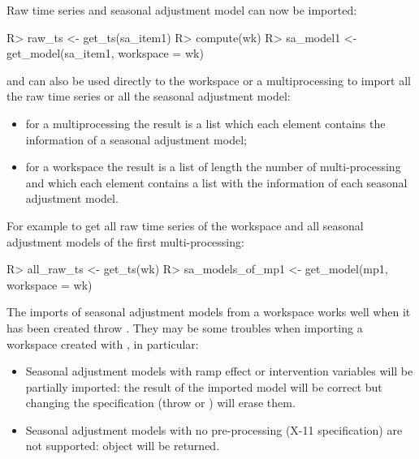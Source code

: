 \documentclass[article]{jss}
\providecommand{\tightlist}{%
  \setlength{\itemsep}{0pt}\setlength{\parskip}{0pt}}
\begin{document}
Raw time series and seasonal adjustment model can now be imported:

\begin{CodeChunk}

\begin{CodeInput}
R> raw_ts <- get_ts(sa_item1)
R> compute(wk)
R> sa_model1 <- get_model(sa_item1, workspace = wk)
\end{CodeInput}
\end{CodeChunk}

 and  can also be used directly to the
workspace or a multiprocessing to import all the raw time series or all
the seasonal adjustment model:

\begin{itemize}
\tightlist
\item
  for a multiprocessing the result is a list which each element contains
  the information of a seasonal adjustment model;\\
\item
  for a workspace the result is a list of length the number of
  multi-processing and which each element contains a list with the
  information of each seasonal adjustment model.
\end{itemize}

For example to get all raw time series of the workspace and all seasonal
adjustment models of the first multi-processing:

\begin{CodeChunk}

\begin{CodeInput}
R> all_raw_ts <- get_ts(wk)
R> sa_models_of_mp1 <- get_model(mp1, workspace = wk)
\end{CodeInput}
\end{CodeChunk}

The imports of seasonal adjustment models from a workspace works well
when it has been created throw . They may be some
troubles when importing a workspace created with ,
in particular:

\begin{itemize}
\tightlist
\item
  Seasonal adjustment models with ramp effect or intervention variables
  will be partially imported: the result of the imported model will be
  correct but changing the specification (throw  or
  ) will erase them.\\
\item
  Seasonal adjustment models with no pre-processing (X-11 specification)
  are not supported:  object will be returned.
\end{itemize}
\end{document}
